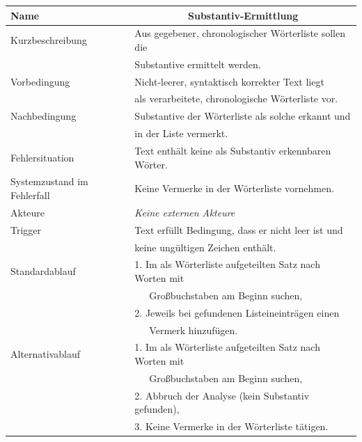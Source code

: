 \documentclass[paper=a4, parskip=half]{scrreprt}
\begin{document}
\begin{table}[htbp]
\begin{tabular}{|l|l|}
\hline
Name                        & \multicolumn{1}{c|}{\textbf{Substantiv-Ermittlung}} \\ \hline
Kurzbeschreibung            & Aus gegebener, chronologischer Wörterliste sollen die \\
                            & Substantive ermittelt werden. \\ \hline
Vorbedingung                & Nicht-leerer, syntaktisch korrekter Text liegt \\
                            & als verarbeitete, chronologische Wörterliste vor. \\ \hline
Nachbedingung               & Substantive der Wörterliste als solche erkannt und \\
                            & in der Liste vermerkt. \\ \hline
Fehlersituation             & Text enthält keine als Substantiv erkennbaren Wörter. \\ \hline
Systemzustand im Fehlerfall & Keine Vermerke in der Wörterliste vornehmen. \\ \hline
Akteure                     & \small{\textit{Keine externen Akteure}} \\ \hline
Trigger                     & Text erfüllt Bedingung, dass er nicht leer ist und \\
                            & keine ungültigen Zeichen enthält. \\ \hline
Standardablauf              & 1. Im als Wörterliste aufgeteilten Satz nach Worten mit \\
                            &    Großbuchstaben am Beginn suchen, \\
                            & 2. Jeweils bei gefundenen Listeineinträgen einen \\
                            &    Vermerk hinzufügen. \\ \hline
Alternativablauf            & 1. Im als Wörterliste aufgeteilten Satz nach Worten mit \\
                            &    Großbuchstaben am Beginn suchen, \\
                            & 2. Abbruch der Analyse (kein Substantiv gefunden), \\
                            & 3. Keine Vermerke in der Wörterliste tätigen. \\ \hline
\end{tabular}
\end{table}
\end{document}
